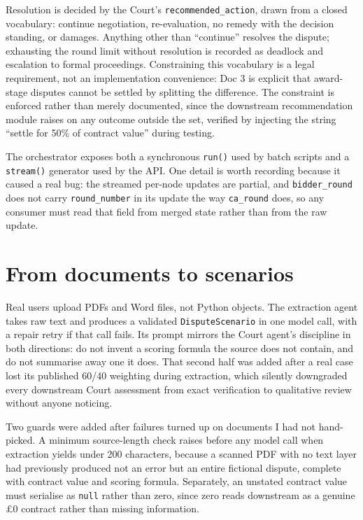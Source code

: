 Resolution is decided by the Court's \texttt{recommended\_action}, drawn from a
closed vocabulary: continue negotiation, re-evaluation, no remedy with the
decision standing, or damages. Anything other than ``continue'' resolves the
dispute; exhausting the round limit without resolution is recorded as deadlock and
escalation to formal proceedings. Constraining this vocabulary is a legal
requirement, not an implementation convenience: Doc 3 is explicit that
award-stage disputes cannot be settled by splitting the difference. The constraint
is enforced rather than merely documented, since the downstream recommendation
module raises on any outcome outside the set, verified by injecting the string
``settle for 50\% of contract value'' during testing.

The orchestrator exposes both a synchronous \texttt{run()} used by batch scripts
and a \texttt{stream()} generator used by the API. One detail is worth recording
because it caused a real bug: the streamed per-node updates are partial, and
\texttt{bidder\_round} does not carry \texttt{round\_number} in its update the way
\texttt{ca\_round} does, so any consumer must read that field from merged state
rather than from the raw update.

\section{From documents to scenarios}
\label{sec:extraction}

Real users upload PDFs and Word files, not Python objects. The extraction agent
takes raw text and produces a validated \texttt{DisputeScenario} in one model
call, with a repair retry if that call fails. Its prompt mirrors the Court
agent's discipline in both directions: do not invent a scoring formula the source
does not contain, and do not summarise away one it does. That second half was
added after a real case lost its published 60/40 weighting during extraction,
which silently downgraded every downstream Court assessment from exact
verification to qualitative review without anyone noticing.

Two guards were added after failures turned up on documents I had not hand-picked.
A minimum source-length check raises before any model call when extraction yields
under 200 characters, because a scanned PDF with no text layer had previously
produced not an error but an entire fictional dispute, complete with contract
value and scoring formula. Separately, an unstated contract value must serialise
as \texttt{null} rather than zero, since zero reads downstream as a genuine
\pounds0 contract rather than missing information.

